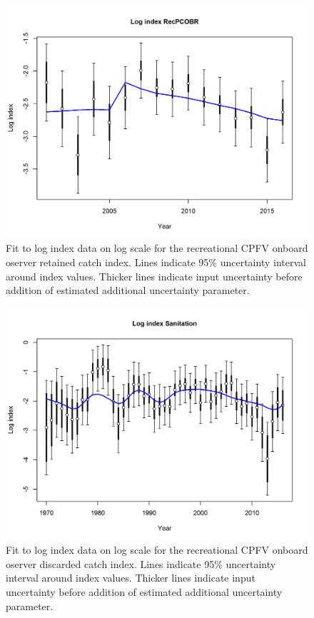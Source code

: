 \documentclass[12pt,]{article}
\begin{document}
\begin{figure}[htbp]
\centering
\includegraphics{r4ss/plots_mod1/index5_logcpuefit_RecPCOBR.png}
\caption{Fit to log index data on log scale for the recreational CPFV
onboard oserver retained catch index. Lines indicate 95\% uncertainty
interval around index values. Thicker lines indicate input uncertainty
before addition of estimated additional uncertainty parameter.
\label{fig:Fleet12_index5_logcpuefit_RecPCOBR}}
\end{figure}

\FloatBarrier

\begin{figure}[htbp]
\centering
\includegraphics{r4ss/plots_mod1/index5_logcpuefit_Sanitation.png}
\caption{Fit to log index data on log scale for the recreational CPFV
onboard oserver discarded catch index. Lines indicate 95\% uncertainty
interval around index values. Thicker lines indicate input uncertainty
before addition of estimated additional uncertainty parameter.
\label{fig:index5_logcpuefit_Sanitation}}
\end{figure}
\end{document}
